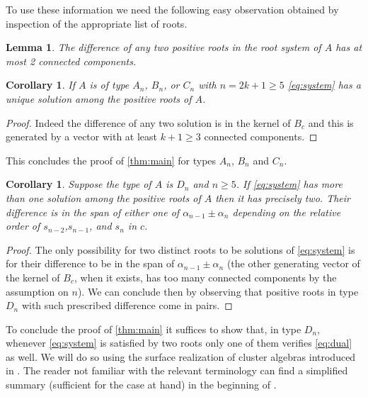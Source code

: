 \documentclass[11pt]{amsart}
\newtheorem{corollary}[theorem]{Corollary}
\newtheorem{lemma}[theorem]{Lemma}
\numberwithin{equation}{section}
\numberwithin{figure}{section}
\begin{document}
  To use these information we need the following easy observation obtained by inspection of the appropriate list of roots.
  \begin{lemma}
    The difference of any two positive roots in the root system of $A$ has at most 2 connected components.
  \end{lemma}

  \begin{corollary}
    If $A$ is of type $A_n$, $B_n$, or $C_n$ with $n=2k+1\geq 5$ \cref{eq:system} has a unique solution among the positive roots of $A$.
  \end{corollary}
  \begin{proof}
    Indeed the difference of any two solution is in the kernel of $B_c$ and this is generated by a vector with at least $k+1\geq3$ connected components.
  \end{proof}
  This concludes the proof of \cref{thm:main} for types $A_n$, $B_n$ and $C_n$.

  \begin{corollary}
    \label{cor:kernel-Dn}
    Suppose the type of $A$ is $D_n$ and $n\geq 5$. 
    If \cref{eq:system} has more than one solution among the positive roots of $A$ then it has precisely two. 
    Their difference is in the span of either one of $\alpha_{n-1}\pm\alpha_n$ depending on the relative order of $s_{n-2}$,$s_{n-1}$, and $s_n$ in $c$.
  \end{corollary}
  \begin{proof}
    The only possibility for two distinct roots to be solutions of \cref{eq:system} is for their difference to be in the span of $\alpha_{n-1}\pm\alpha_n$ (the other generating vector of the kernel of $B_c$, when it exists, has too many connected components by the assumption on $n$). 
    We can conclude then by observing that positive roots in type $D_n$ with such prescribed difference come in pairs.
  \end{proof}

  To conclude the proof of \cref{thm:main} it suffices to show that, in type $D_n$, whenever \cref{eq:system} is satisfied by two roots only one of them verifies \cref{eq:dual} as well.  
  We will do so using the surface realization of cluster algebras introduced in \cite{FST08,FT12}. 
  The reader not familiar with the relevant terminology can find a simplified summary (sufficient for the case at hand) in the beginning of \cite[Section 4.1]{NS14}.
  
\end{document}
